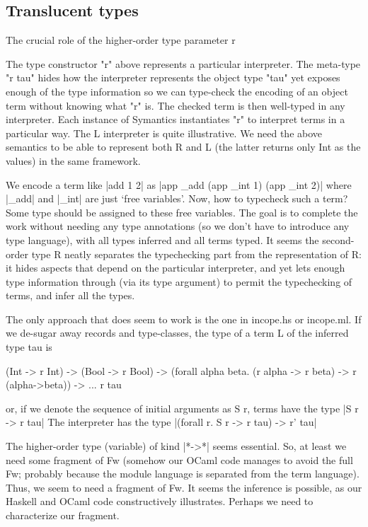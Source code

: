 \documentclass[preprint]{sigplanconf}
\begin{document}
\subsection{Translucent types}
The crucial role of the higher-order type parameter r

The type constructor "r" above represents a particular interpreter.  The
meta-type "r tau" hides how the interpreter represents the object type
"tau" yet exposes enough of the type information so we can type-check
the encoding of an object term without knowing what "r" is.  The checked
term is then well-typed in any interpreter.  Each instance of Symantics
instantiates "r" to interpret terms in a particular way. The L
interpreter is quite illustrative. We need the above semantics to be
able to represent both R and L (the latter returns only Int as the
values) in the same framework.

We encode a term like |add 1 2| as
|app _add (app _int 1) (app _int 2)| where |_add| and |_int| are just
`free variables'. Now, how to typecheck such a term? Some type should
be assigned to these free variables. The goal is to complete the work
without needing any type annotations (so we don't have to introduce any
type language), with all types inferred and all terms typed. It seems
the second-order type R neatly separates the typechecking part from
the representation of R: it hides aspects that depend on the
particular interpreter, and yet lets enough type information through
(via its type argument) to permit the typechecking of terms, and infer
all the types. 



The only approach that does seem to work
is the one in incope.hs or incope.ml. If we de-sugar away records and
type-classes, the type of a term L of the inferred type tau is

\begin{code}
  (Int -> r Int) ->
  (Bool -> r Bool) ->
  (forall alpha beta. (r alpha -> r beta) -> r (alpha->beta)) -> ... r tau
\end{code}

or, if we denote the sequence of initial arguments as S r, terms have
the type |S r -> r tau|
The interpreter has the type
|(forall r. S r -> r tau) -> r' tau|

The higher-order type (variable) of kind |*->*| seems essential. So, at
least we need some fragment of Fw (somehow our OCaml code manages to
avoid the full Fw; probably because the module language is separated
from the term language). Thus, we seem to need a fragment of Fw. It
seems the inference is possible, as our Haskell and OCaml code
constructively illustrates. Perhaps we need to characterize our
fragment.
\end{document}
